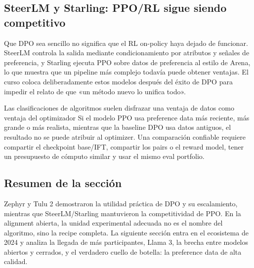 \subsection{SteerLM y Starling: PPO/RL sigue siendo competitivo}

Que DPO sea sencillo no significa que el RL on-policy haya dejado de funcionar. SteerLM controla la salida mediante condicionamiento por atributos y señales de preferencia, y Starling ejecuta PPO sobre datos de preferencia al estilo de Arena, lo que muestra que un pipeline más complejo todavía puede obtener ventajas. El curso coloca deliberadamente estos modelos después del éxito de DPO para impedir el relato de que «un método nuevo lo unifica todo».


\begin{warningbox}{Las clasificaciones de algoritmos suelen disfrazar una ventaja de datos como ventaja del optimizador}
Si el modelo PPO usa preference data más reciente, más grande o más realista, mientras que la baseline DPO usa datos antiguos, el resultado no se puede atribuir al optimizer. Una comparación confiable requiere compartir el checkpoint base/IFT, compartir los pairs o el reward model, tener un presupuesto de cómputo similar y usar el mismo eval portfolio.
\end{warningbox}


\subsection{Resumen de la sección}

Zephyr y Tulu 2 demostraron la utilidad práctica de DPO y su escalamiento, mientras que SteerLM/Starling mantuvieron la competitividad de PPO. En la alignment abierta, la unidad experimental adecuada no es el nombre del algoritmo, sino la recipe completa. La siguiente sección entra en el ecosistema de 2024 y analiza la llegada de más participantes, Llama 3, la brecha entre modelos abiertos y cerrados, y el verdadero cuello de botella: la preference data de alta calidad.
